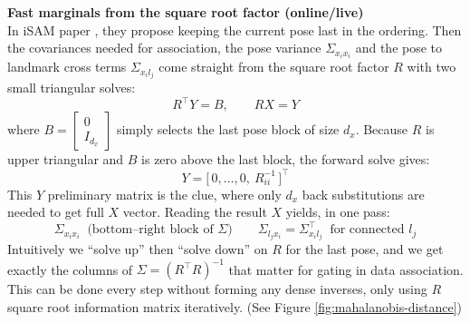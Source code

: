 \noindent
\textbf{Fast marginals from the square root factor (online/live)} 
\\ \noindent
In iSAM paper \cite{iSAM_paper}, they propose keeping the current pose last in the ordering. Then the covariances needed for association, the pose variance $\Sigma_{x_i x_i}$ and the pose to landmark cross terms $\Sigma_{x_i l_j}$ come straight from the square root factor $R$ with two small triangular solves:
$$
    R^\top Y = B,\qquad R X = Y
$$
where $B=\begin{bmatrix}0\\ I_{d_x}\end{bmatrix}$ simply selects the last pose block of size $d_x$. Because $R$ is upper triangular and $B$ is zero above the last block, the forward solve gives:
$$
Y=\big[\,0,\ldots,0,\ R_{ii}^{-1}\,\big]^\top
$$
This $Y$ preliminary matrix is the clue, where only $d_x$ back substitutions are needed to get full $X$ vector. Reading the result $X$ yields, in one pass:
$$
\Sigma_{x_i x_i} \;\; \text{(bottom–right block of } \Sigma)\qquad
\Sigma_{l_j x_i}=\Sigma_{x_i l_j}^\top \;\; \text{for connected } l_j
$$
Intuitively we ``solve up'' then ``solve down'' on $R$ for the last pose, and we get exactly the columns of $\Sigma=(R^\top R)^{-1}$ that matter for gating in data association. This can be done every step without forming any dense inverses, only using $R$ square root information matrix iteratively. (See Figure \ref{fig:mahalanobis-distance})
